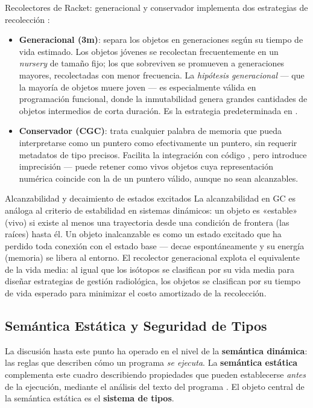 \begin{definicion}{Recolectores de Racket: generacional y conservador}
 implementa dos estrategias de recolección \cite{SICP, HtDP}:
\begin{itemize}
    \item \textbf{Generacional (3m)}: separa los objetos en generaciones según su tiempo de vida estimado. Los objetos jóvenes se recolectan frecuentemente en un \textit{nursery} de tamaño fijo; los que sobreviven se promueven a generaciones mayores, recolectadas con menor frecuencia. La \textit{hipótesis generacional} — que la mayoría de objetos muere joven — es especialmente válida en programación funcional, donde la inmutabilidad genera grandes cantidades de objetos intermedios de corta duración. Es la estrategia predeterminada en .
    \item \textbf{Conservador (CGC)}: trata cualquier palabra de memoria que pueda interpretarse como un puntero como efectivamente un puntero, sin requerir metadatos de tipo precisos. Facilita la integración con código , pero introduce imprecisión — puede retener como vivos objetos cuya representación numérica coincide con la de un puntero válido, aunque no sean alcanzables.
\end{itemize}
\end{definicion}

\begin{fisicaconexion}{Alcanzabilidad y decaimiento de estados excitados}
La alcanzabilidad en GC es análoga al criterio de estabilidad en sistemas dinámicos: un objeto es «estable» (vivo) si existe al menos una trayectoria desde una condición de frontera (las raíces) hasta él. Un objeto inalcanzable es como un estado excitado que ha perdido toda conexión con el estado base — decae espontáneamente y su energía (memoria) se libera al entorno. El recolector generacional explota el equivalente de la vida media: al igual que los isótopos se clasifican por su vida media para diseñar estrategias de gestión radiológica, los objetos se clasifican por su tiempo de vida esperado para minimizar el costo amortizado de la recolección.
\end{fisicaconexion}

\subsection{Semántica Estática y Seguridad de Tipos}
\label{subsec:4_5_4_type_safety}

La discusión hasta este punto ha operado en el nivel de la \textbf{semántica dinámica}: las reglas que describen cómo un programa \textit{se ejecuta}. La \textbf{semántica estática} complementa este cuadro describiendo propiedades que pueden establecerse \textit{antes} de la ejecución, mediante el análisis del texto del programa \cite{PFPL, TAPL}. El objeto central de la semántica estática es el \textbf{sistema de tipos}.

